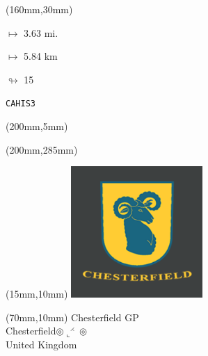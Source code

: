 \begin{textblock*}{40mm}(160mm,30mm)%
\Large
\par$\mapsto$ 3.63 mi.
\par$\mapsto$ 5.84 km
\par$\looparrowright$ 15
\par\hfill\tiny\tt CAHIS3\\
\end{textblock*}
\begin{textblock*}{20mm}(200mm,5mm)%
\fbox{\thepage}
\label{CAHIS3}
\end{textblock*}
\begin{textblock*}{20mm}(200mm,285mm)%
\fbox{\thepage}
\end{textblock*}

\null\newpage
\begin{textblock*}{50mm}(15mm,10mm)%
\includegraphics[width=50mm]{LG/2015-06-23_00001.png}
\end{textblock*}
\begin{textblock*}{130mm}(70mm,10mm)%
{\fontsize{20}{20}\selectfont Chesterfield GP\\}
{\fontsize{16}{16}\selectfont Chesterfield\hfill $\circledcirc\llcorner^{\rightthreetimes}\circledcirc$\\}
{\fontsize{12}{12}\selectfont United Kingdom\\}
\end{textblock*}
